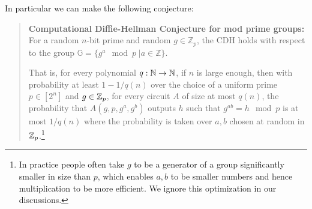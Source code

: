 In particular we can make the following conjecture:

\begin{quote}
\textbf{Computational Diffie-Hellman Conjecture for mod prime groups:}
For a random \(n\)-bit prime and random \(g \in \mathbb{Z}_p\), the CDH
holds with respect to the group
\(\mathbb{G} = \{ g^a \mod p \;| a\in \mathbb{Z} \}\).

That is, for every polynomial \(q:{\mathbb{N}} \rightarrow {\mathbb{N}}\), if \(n\) is large
enough, then with probability at least \(1-1/q(n)\) over the choice of a
uniform prime \(p\in [2^n]\) and \(g\in {\mathbb{Z}}_p\), for every circuit \(A\)
of size at most \(q(n)\), the probability that \(A(g,p,g^a,g^b)\)
outputs \(h\) such that \(g^{ab} = h \mod p\) is at most \(1/q(n)\)
where the probability is taken over \(a,b\) chosen at random in
\({\mathbb{Z}}_p\).\footnote{In practice people often take \(g\) to be a generator
  of a group significantly smaller in size than \(p\), which enables
  \(a,b\) to be smaller numbers and hence multiplication to be more
  efficient. We ignore this optimization in our discussions.}
\end{quote}


\hypertarget{DHROMthm}{}

